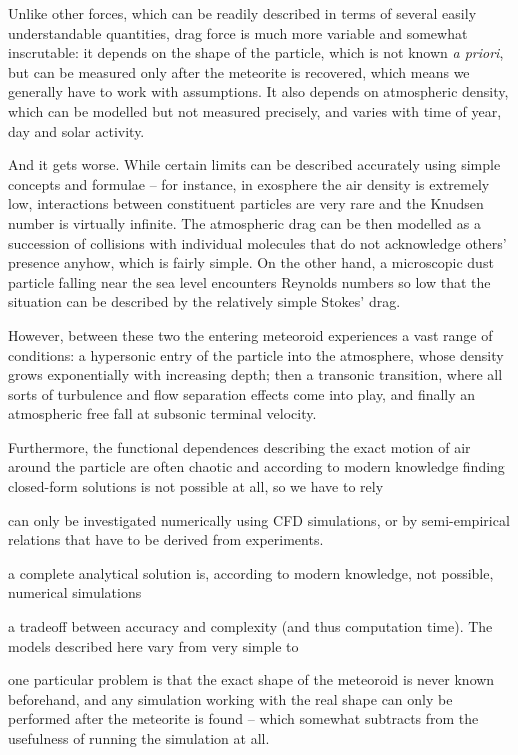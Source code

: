         Unlike other forces, which can be readily described in terms of several easily understandable
        quantities, drag force is much more variable and somewhat inscrutable: it depends on the shape
        of the particle, which is not known \textit{a priori}, but can be measured only after
        the meteorite is recovered, which means we generally have to work with assumptions.
        It also depends on atmospheric density, which can be modelled but not measured precisely,
        and varies with time of year, day and solar activity.

        And it gets worse. While certain limits can be described accurately using
        simple concepts and formulae -- for instance, in exosphere the air density is extremely low,
        interactions between constituent particles are very rare and the Knudsen number is virtually infinite.
        The atmospheric drag can be then modelled as a succession of collisions with individual
        molecules that do not acknowledge others' presence anyhow, which is fairly simple.
        On the other hand, a microscopic dust particle falling near the sea level encounters
        Reynolds numbers so low that the situation can be described by the relatively simple Stokes' drag.

        However, between these two the entering meteoroid experiences a vast range of conditions:
        a hypersonic entry of the particle into the atmosphere, whose density grows exponentially with increasing depth;
        then a transonic transition, where all sorts of turbulence and flow separation effects come into play,
        and finally an atmospheric free fall at subsonic terminal velocity.

        Furthermore, the functional dependences describing the exact motion
        of air around the particle are often chaotic and according to modern knowledge
        finding closed-form solutions is not possible at all, so we have to rely


        can only be investigated numerically using CFD simulations, or by semi-empirical
        relations that have to be derived from experiments.


         a complete analytical solution
        is, according to modern knowledge, not possible, numerical simulations

        a tradeoff between accuracy and complexity (and thus computation time).
        The models described here vary from very simple to 

        one particular problem is that the exact shape of the meteoroid is never known beforehand,
        and any simulation working with the real shape can only be performed after the meteorite is
        found -- which somewhat subtracts from the usefulness of running the simulation at all.

